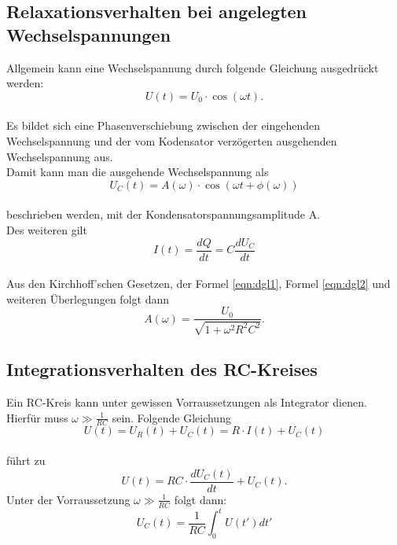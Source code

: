 \subsection{Relaxationsverhalten bei angelegten Wechselspannungen}
Allgemein kann eine Wechselspannung durch folgende Gleichung ausgedrückt werden:
\begin{equation}
  U(t)= U_{0} \cdot \cos(\omega t).
  \label{eqn:acdcein}
\end{equation}
\\Es bildet sich eine Phasenverschiebung \phi zwischen der eingehenden Wechselspannung und der vom Kodensator verzögerten ausgehenden Wechselspannung aus.
\\Damit kann man die ausgehende Wechselspannung als
\begin{equation}
  U_{C}(t)= A(\omega) \cdot \cos(\omega t + \phi (\omega))
  \label{eqn:acdcaus}
\end{equation}
\\beschrieben werden, mit der Kondensatorspannungsamplitude A.
\\Des weiteren gilt
\begin{equation}
  I(t) = \frac{dQ}{dt} = C \frac{d U_{C}}{dt}
  \label{eqn:dgl2}
\end{equation}
\\Aus den Kirchhoff'schen Gesetzen, der Formel \eqref{eqn:dgl1}, Formel \eqref{eqn:dgl2} und weiteren Überlegungen folgt dann
\begin{equation}
  A(\omega) = \frac{U_{0}}{\sqrt{1+ \omega^2 R^2 C^2}}.
  \label{eqn:ampkond}
\end{equation}

\subsection{Integrationsverhalten des RC-Kreises}
Ein RC-Kreis kann unter gewissen Vorraussetzungen als Integrator dienen.
Hierfür muss $\omega \gg \frac{1}{RC}$ sein.
Folgende Gleichung
\begin{equation*}
  U(t)= U_{R}(t) + U_{C}(t) = R \cdot I(t) + U_{C}(t)
\end{equation*}
\\führt zu
\begin{equation*}
  U(t)= RC \cdot \frac{d U_{C}(t)}{dt} + U_{C}(t).
\end{equation*}
Unter der Vorraussetzung $\omega \gg \frac{1}{RC}$ folgt dann:
\begin{equation}
  U_{C}(t) = \frac{1}{RC} \int_{0}^{t} \! U(t')dt'
  \label{eqn:integrator}
\end{equation}
